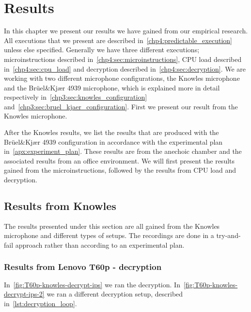 \chapter{Results}
\label{chp5:results} 
In this chapter we present our results we have gained from our empirical research. 
All executions that we present are described in~\autoref{chp4:predictable_execution} unless else specified. 
Generally we have three different executions; microinstructions described in~\autoref{chp4:sec:microinstructions}, CPU load described in~\autoref{chp4:sec:cpu_load} and decryption described in~\autoref{chp4:sec:decryption}. 
We are working with two different microphone configurations, the Knowles microphone and the Brüel\&Kjær 4939 microphone, which is explained more in detail respectively in~\autoref{chp3:sec:knowles_configuration} and~\autoref{chp3:sec:bruel_kjaer_configuration}.
First we present our result from the Knowles microphone.

After the Knowles results, we list the results that are produced with the Brüel\&Kjær 4939 configuration in accordance with the experimental plan in~\autoref{apx:experiment_plan}. 
These results are from the anechoic chamber and the associated results from an office environment.  
We will first present the results gained from the microinstructions, followed by the results from CPU load and decryption. 

\section{Results from Knowles}\label{chp5:sec:knowles_results}
The results presented under this section are all gained from the Knowles microphone and different types of setups.
The recordings are done in a try-and-fail approach rather than according to an experimental plan. 

\subsection{Results from Lenovo T60p - decryption}\label{chp5:subsec:t60p_knowles_results_decryption}
In~\autoref{fig:T60p-knowles-decrypt-ips} we ran the decryption. 
In~\autoref{fig:T60p-knowles-decrypt-ips-2} we ran a different decryption setup, described in~\autoref{lst:decryption_loop}.


